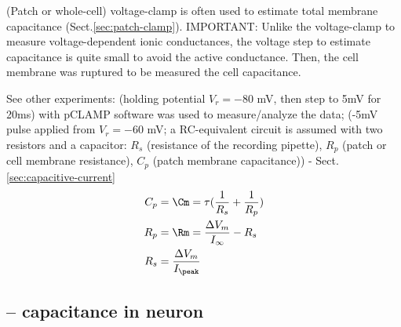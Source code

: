 \begin{mdframed}

(Patch or whole-cell) voltage-clamp is often used to estimate total membrane
capacitance (Sect.\ref{sec:patch-clamp}). IMPORTANT: Unlike the voltage-clamp to
measure voltage-dependent ionic conductances, the voltage step to estimate
capacitance is quite small to avoid the active conductance. Then, the cell
membrane was ruptured to be measured the cell capacitance.



See other experiments: \citep{benitah1993} (holding potential $V_r=-80$ mV, then
step to 5mV for 20ms) with pCLAMP software was used to measure/analyze the data;
\citep{gentet2008} (-5mV pulse applied from $V_r = -60$ mV; a RC-equivalent
circuit is assumed with two resistors and a capacitor: $R_s$ (resistance of the
recording pipette), $R_p$ (patch or cell membrane resistance), $C_p$ (patch
membrane capacitance)) - Sect.\ref{sec:capacitive-current}
\begin{equation*}
\label{eq:capacitive-calculation}
\begin{split}
C_p &= \Cm = \tau (\frac{1}{R_s} + \frac{1}{R_p}) \\
R_p &= \Rm = \frac{\Delta V_m}{I_\infty} - R_s \\
R_s &= \frac{\Delta V_m}{I_\peak}
\end{split}
\end{equation*}
\end{mdframed}

\subsection{-- capacitance in neuron}
\label{sec:capacitance-in-neurons}


